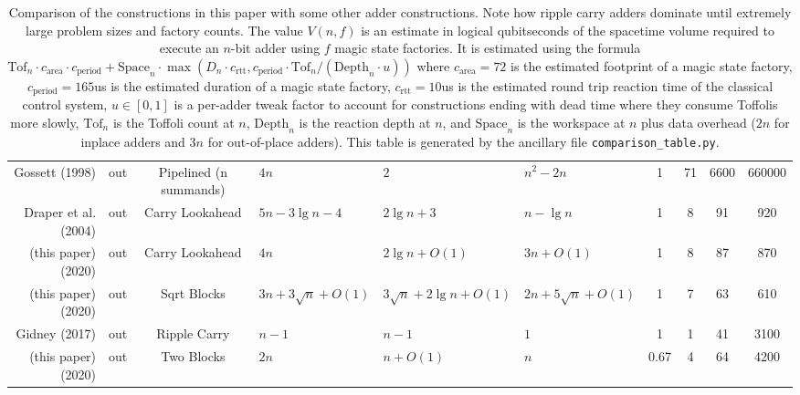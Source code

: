 \documentclass[onecolumn,unpublished]{quantumarticle}
\theoremstyle{definition}
\theoremstyle{definition}
\theoremstyle{definition}
\begin{document}
\begin{table}
{\begin{tabular}{r|c|c|l|l|l|c|c|c|c}
\hline
Gossett (1998) \cite{gossett1998carrysave}           &out   &Pipelined (n summands) &$4n$                   &$2$                        &$n^2 - 2n$             &1    &71            &6600            &660000            \\
Draper et al. (2004) \cite{draper2004lookaheadadder} &out   &Carry Lookahead        &$5n - 3\lg n - 4$      &$2\lg n + 3$               &$n - \lg n$            &1    &8             &91              &920               \\
(this paper) (2020)                                  &out   &Carry Lookahead        &$4n$                   &$2\lg n + O(1)$            &$3n + O(1)$            &1    &8             &87              &870               \\
(this paper) (2020)                                  &out   &Sqrt Blocks            &$3n + 3\sqrt n + O(1)$ &$3\sqrt n + 2\lg n + O(1)$ &$2n + 5\sqrt n + O(1)$ &1    &7             &63              &610               \\
Gidney (2017) \cite{gidney2018halving}                      &out   &Ripple Carry           &$n - 1$                &$n - 1$                    &$1$                    &1    &1             &41              &3100              \\
(this paper) (2020)                                  &out   &Two Blocks             &$2n$                   &$n + O(1)$                 &$n$                    &0.67 &4             &64              &4200              \\
\end{tabular}
}
    \caption{Comparison of the constructions in this paper with some other adder constructions.
    Note how ripple carry adders dominate until extremely large problem sizes and factory counts.
    The value $V(n,f)$ is an estimate in logical qubitseconds of the spacetime volume required to execute an $n$-bit adder using $f$ magic state factories.
    It is estimated using the formula $\text{Tof}_n \cdot c_{\text{area}} \cdot c_{\text{period}} + \text{Space}_n \cdot \max(D_n \cdot c_{\text{rtt}}, c_{\text{period}} \cdot \text{Tof}_n / (\text{Depth}_n \cdot u))$ where $c_{\text{area}}=72$ is the estimated footprint of a magic state factory, $c_{\text{period}}=165$us is the estimated duration of a magic state factory, $c_{\text{rtt}}=10$us is the estimated round trip reaction time of the classical control system, $u \in [0, 1]$ is a per-adder tweak factor to account for constructions ending with dead time where they consume Toffolis more slowly, $\text{Tof}_n$ is the Toffoli count at $n$, $\text{Depth}_n$ is the reaction depth at $n$, and $\text{Space}_n$ is the workspace at $n$ plus data overhead ($2n$ for inplace adders and $3n$ for out-of-place adders). This table is generated by the ancillary file \texttt{comparison\_table.py}.
    }
    \label{tab:comparison}
\end{table}
\end{document}
